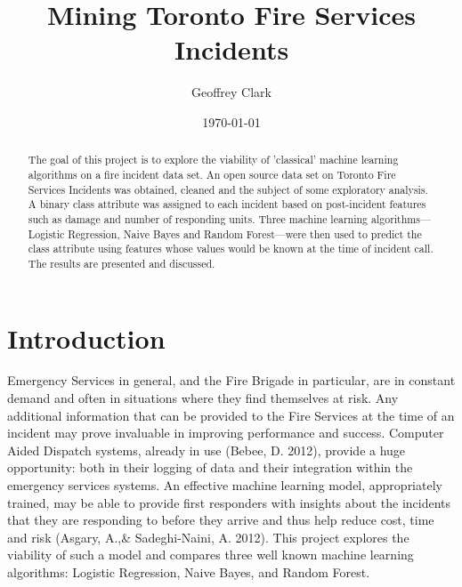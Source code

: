 \documentclass[12pt,letterpaper, oneside]
{article}
\title{Mining Toronto Fire Services Incidents}
\author{Geoffrey Clark}
\date{\today}
\begin{document}
\maketitle

\begin{abstract}
The goal of this project is to explore the viability of 'classical' machine learning algorithms on a fire incident data set. An open source data set on Toronto Fire Services Incidents was obtained, cleaned and the subject of some exploratory analysis. A binary class attribute was assigned to each incident based on post-incident features such as damage and number of responding units. Three machine learning algorithms—Logistic Regression, Naive Bayes and Random Forest—were then used to predict the class attribute using features whose values would be known at the time of incident call. The results are presented and discussed.
\end{abstract}

\tableofcontents 


\section{Introduction}

Emergency Services in general, and the Fire Brigade in particular, are in constant demand and often in situations where they find themselves at risk. Any additional information that can be provided to the Fire Services at the time of an incident may prove invaluable in improving performance and success. Computer Aided Dispatch systems, already in use (Bebee, D. 2012), provide a huge opportunity: both in their logging of data and their integration within the emergency services systems. An effective machine learning model, appropriately trained, may be able to provide first responders with insights about the incidents that they are responding to before they arrive and thus help reduce cost, time and risk (Asgary, A.,\& Sadeghi-Naini, A. 2012). This project explores the viability of such a model and compares three well known machine learning algorithms: Logistic Regression, Naive Bayes, and Random Forest. 
\end{document}
